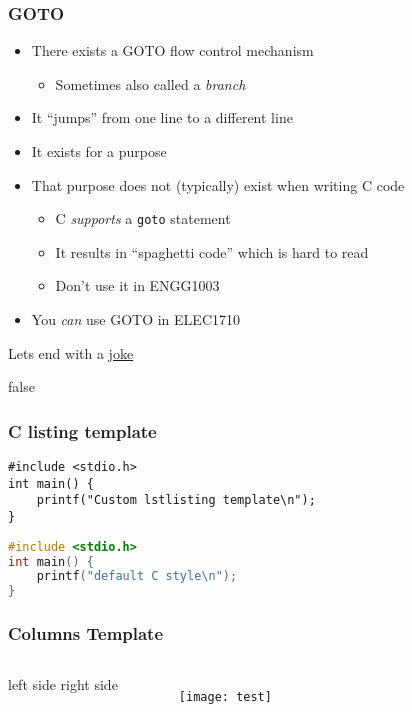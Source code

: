 \documentclass[14pt]{beamer}
\begin{document}
\begin{frame}
\frametitle{GOTO}
\begin{itemize}
\item There exists a GOTO flow control mechanism
	\begin{itemize}
		\item Sometimes also called a \textit{branch}
	\end{itemize}
\item It ``jumps'' from one line to a different line
\item It exists for a purpose
\item That purpose does not (typically) exist when writing C code
	\begin{itemize}
		\item C \textit{supports} a \texttt{goto} statement
		\item It results in ``spaghetti code'' which is hard to read
		\item Don't use it in ENGG1003
	\end{itemize}
\item You \textit{can} use GOTO in ELEC1710
\end{itemize}
\end{frame}


\begin{frame}
\centering
Lets end with a \underline{\href{https://twitter.com/brenankeller/status/1068615953989087232?lang=en}{joke}}
\end{frame}

\if false
\begin{frame}[fragile] %
\frametitle{C listing template}
\begin{lstlisting}[style=CStyle]
#include <stdio.h>
int main() {
	printf("Custom lstlisting template\n");
}
\end{lstlisting}

\begin{lstlisting}[language=c]
#include <stdio.h>
int main() {
	printf("default C style\n");
}
\end{lstlisting}
\end{frame}

\begin{frame}
\frametitle{Columns Template}
\begin{columns}
\column{1.5in}
left side
\column{1.5in}
right side
\begin{figure}
\texttt{[image: test]}
\end{figure}
\end{columns}
\end{frame}
\fi
\end{document}
